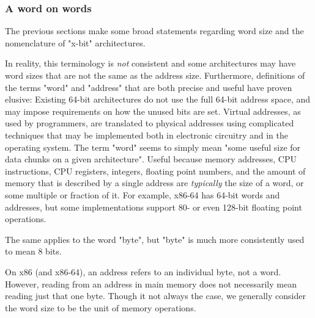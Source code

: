 \subsubsection{A word on words}
The previous sections make some broad statements regarding word size and the
nomenclature of "x-bit" architectures.

In reality, this terminology is \textit{not} consistent and some architectures may
have word sizes that are not the same as the address size. Furthermore,
definitions of the terms "word" and "address" that are both precise and useful
have proven elusive: Existing 64-bit architectures do not use the full 64-bit
address space, and may impose requirements on how the unused bits are set.
Virtual addresses, as used by programmers, are translated to physical addresses
using complicated techniques that may be implemented both in electronic
circuitry and in the operating system. The term "word" seems to simply mean
"some useful size for data chunks on a given architecture". Useful because
memory addresses, CPU instructions, CPU registers, integers, floating point
numbers, and the amount of memory that is described by a single address are
\textit{typically} the size of a word, or some multiple or fraction of it. For
example, x86-64 has 64-bit words and addresses, but some implementations support
80- or even 128-bit floating point operations.

The same applies to the word "byte", but "byte" is much more consistently used
to mean 8 bits.

On x86 (and x86-64), an address refers to an individual byte, not a word. However,
reading from an address in main memory does not necessarily mean reading just
that one byte. Though it not always the case, we generally consider the word
size to be the unit of memory operations.
